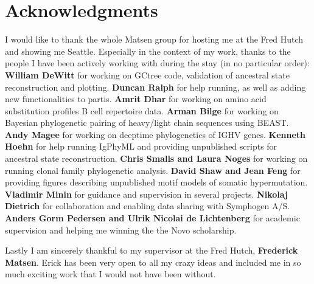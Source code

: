 % 

\cleardoublepage

\section*{Acknowledgments}
I would like to thank the whole Matsen group for hosting me at the Fred Hutch and showing me Seattle.
Especially in the context of my work, thanks to the people I have been actively working with during the stay (in no particular order):
\textbf{William DeWitt} for working on GCtree code, validation of ancestral state reconstruction and plotting.
\textbf{Duncan Ralph} for help running, as well as adding new functionalities to partis.
\textbf{Amrit Dhar} for working on amino acid substitution profiles B cell repertoire data.
\textbf{Arman Bilge} for working on Bayesian phylogenetic pairing of heavy/light chain sequences using BEAST.
\textbf{Andy Magee} for working on deeptime phylogenetics of IGHV genes.
\textbf{Kenneth Hoehn} for help running IgPhyML and providing unpublished scripts for ancestral state reconstruction.
\textbf{Chris Smalls and Laura Noges} for working on running clonal family phylogenetic analysis.
\textbf{David Shaw and Jean Feng} for providing figures describing unpublished motif models of somatic hypermutation.
\textbf{Vladimir Minin} for guidance and supervision in several projects.
\textbf{Nikolaj Dietrich} for collaboration and enabling data sharing with Symphogen A/S.
\textbf{Anders Gorm Pedersen and Ulrik Nicolai de Lichtenberg} for academic supervision and helping me winning the the Novo scholarship.

Lastly I am sincerely thankful to my supervisor at the Fred Hutch, \textbf{Frederick Matsen}.
Erick has been very open to all my crazy ideas and included me in so much exciting work that I would not have been without.


